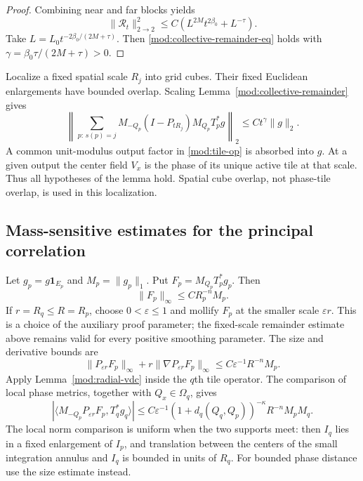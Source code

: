 \documentclass[11pt]{article}
\numberwithin{equation}{section}
\theoremstyle{remark}
\theoremstyle{definition}
\begin{document}
\begin{proof}
Combining near and far blocks yields
\[
 \|\mathcal R_t\|_{2\to2}^2
 \le C(L^{2M}t^{2\beta_0}+L^{-\tau}).
\]
Take $L=L_0t^{-2\beta_0/(2M+\tau)}$. Then
\eqref{mod:collective-remainder-eq} holds with
$\gamma=\beta_0\tau/(2M+\tau)>0$.
\end{proof}

Localize a fixed spatial scale $R_j$ into grid cubes. Their fixed
Euclidean enlargements have bounded overlap. Scaling
Lemma~\ref{mod:collective-remainder} gives
\begin{equation}\label{mod:scale-remainder}
 \left\|\sum_{p:\,s(p)=j}
 M_{-Q_p}(I-P_{tR_j})M_{Q_p}T_p^*g\right\|_2
 \le Ct^\gamma\|g\|_2.
\end{equation}
A common unit-modulus output factor in \eqref{mod:tile-op} is absorbed
into $g$. At a given output the center field $V_x$ is the phase of its
unique active tile at that scale. Thus all hypotheses of the lemma hold.
Spatial cube overlap, not phase-tile overlap, is used in this localization.

\subsection{Mass-sensitive estimates for the principal correlation}
Let $g_p=g\mathbf1_{E_p}$ and $M_p=\|g_p\|_1$. Put
$F_p=M_{Q_p}T_p^*g_p$. Then
\begin{equation}\label{mod:mass-bound}
 \|F_p\|_\infty\le CR_p^{-n}M_p.
\end{equation}
If $r=R_q\le R=R_p$, choose $0<\varepsilon\le1$ and mollify $F_p$ at the smaller scale $\varepsilon r$.
This is a choice of the auxiliary proof parameter; the fixed-scale remainder
estimate above remains valid for every positive smoothing parameter.
The size and derivative bounds are
\[
 \|P_{\varepsilon r}F_p\|_\infty
 +r\|\nabla P_{\varepsilon r}F_p\|_\infty
 \le C\varepsilon^{-1}R^{-n}M_p.
\]
Apply Lemma~\ref{mod:radial-vdc} inside the $q$th tile operator. The
comparison of local phase metrics, together with $Q_x\in\Omega_q$, gives
\begin{equation}\label{mod:main-correlation}
 \left|\langle M_{-Q_p}P_{\varepsilon r}F_p,T_q^*g_q\rangle\right|
 \le C\varepsilon^{-1}(1+d_q(Q_q,Q_p))^{-\kappa}
 R^{-n}M_pM_q.
\end{equation}
The local norm comparison is uniform when the two supports meet: then
$I_q$ lies in a fixed enlargement of $I_p$, and translation between the
centers of the small integration annulus and $I_q$ is bounded in units
of $R_q$. For bounded phase distance use the size estimate instead.
\end{document}
